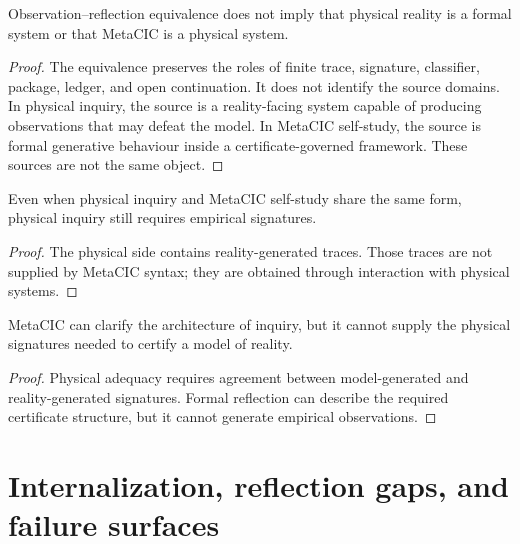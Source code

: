 \begin{theorem}
\label{thm:observation-reflection-architectural-not-ontological}
Observation--reflection equivalence does not imply that physical reality is a formal system or that MetaCIC is a physical system.
\end{theorem}

\begin{proof}
The equivalence preserves the roles of finite trace, signature, classifier, package, ledger, and open continuation. It does not identify the source domains. In physical inquiry, the source is a reality-facing system capable of producing observations that may defeat the model. In MetaCIC self-study, the source is formal generative behaviour inside a certificate-governed framework. These sources are not the same object.
\end{proof}

\begin{corollary}
\label{cor:structural-equivalence-empirical-content}
Even when physical inquiry and MetaCIC self-study share the same form, physical inquiry still requires empirical signatures.
\end{corollary}

\begin{proof}
The physical side contains reality-generated traces. Those traces are not supplied by MetaCIC syntax; they are obtained through interaction with physical systems.
\end{proof}

\begin{corollary}
\label{cor:formal-reflection-not-experiment}
MetaCIC can clarify the architecture of inquiry, but it cannot supply the physical signatures needed to certify a model of reality.
\end{corollary}

\begin{proof}
Physical adequacy requires agreement between model-generated and reality-generated signatures. Formal reflection can describe the required certificate structure, but it cannot generate empirical observations.
\end{proof}

\section{Internalization, reflection gaps, and failure surfaces}
\label{sec:internalization-reflection-gaps-failure-surfaces}

